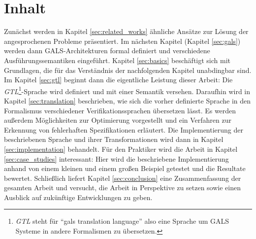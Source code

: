 \section{Inhalt}
Zunächst werden in Kapitel \ref{sec:related_works} ähnliche Ansätze zur Lösung der angesprochenen Probleme präsentiert.
Im nächsten Kapitel (Kapitel \ref{sec:gals}) werden dann GALS-Architekturen formal definiert und verschiedene Ausführungssemantiken eingeführt.
Kapitel \ref{sec:basics} beschäftigt sich mit Grundlagen, die für das Verständnis der nachfolgenden Kapitel unabdingbar sind.
Im Kapitel \ref{sec:gtl} beginnt dann die eigentliche Leistung dieser Arbeit: Die \emph{GTL}\footnote{\emph{GTL} steht für "`gals translation language"' also eine Sprache um GALS Systeme in andere Formalismen zu übersetzen.}-Sprache wird definiert und mit einer Semantik versehen.
Daraufhin wird in Kapitel \ref{sec:translation} beschrieben, wie sich die vorher definierte Sprache in den Formalismus verschiedener Verifikationssprachen übersetzen lässt.
Es werden außerdem Möglichkeiten zur Optimierung vorgestellt und ein Verfahren zur Erkennung von fehlerhaften Spezifikationen erläutert.
Die Implementierung der beschriebenen Sprache und ihrer Transformationen wird dann in Kapitel \ref{sec:implementation} behandelt.
Für den Praktiker wird die Arbeit in Kapitel \ref{sec:case_studies} interessant:
Hier wird die beschriebene Implementierung anhand von einem kleinen und einem großen Beispiel getestet und die Resultate bewertet.
Schließlich liefert Kapitel \ref{sec:conclusion} eine Zusammenfassung der gesamten Arbeit und versucht, die Arbeit in Perspektive zu setzen sowie einen Ausblick auf zukünftige Entwicklungen zu geben.

